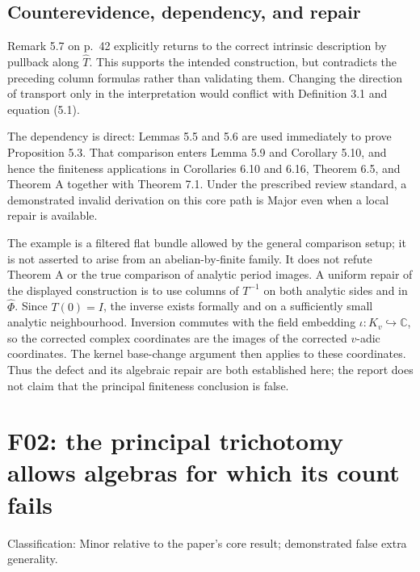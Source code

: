 \documentclass[10pt]{article}
\begin{document}
\subsection*{Counterevidence, dependency, and repair}
Remark 5.7 on p. 42 explicitly returns to the correct intrinsic description by pullback along \(\widehat T\). This supports the intended construction, but contradicts the preceding column formulas rather than validating them. Changing the direction of transport only in the interpretation would conflict with Definition 3.1 and equation (5.1).\par
The dependency is direct: Lemmas 5.5 and 5.6 are used immediately to prove Proposition 5.3. That comparison enters Lemma 5.9 and Corollary 5.10, and hence the finiteness applications in Corollaries 6.10 and 6.16, Theorem 6.5, and Theorem A together with Theorem 7.1. Under the prescribed review standard, a demonstrated invalid derivation on this core path is Major even when a local repair is available.\par
The example is a filtered flat bundle allowed by the general comparison setup; it is not asserted to arise from an abelian-by-finite family. It does not refute Theorem A or the true comparison of analytic period images. A uniform repair of the displayed construction is to use columns of \(T^{-1}\) on both analytic sides and in \(\widehat\Phi\). Since \(T(0)=I\), the inverse exists formally and on a sufficiently small analytic neighbourhood. Inversion commutes with the field embedding \(\iota:K_v\hookrightarrow\mathbb C\), so the corrected complex coordinates are the images of the corrected \(v\)-adic coordinates. The kernel base-change argument then applies to these coordinates. Thus the defect and its algebraic repair are both established here; the report does not claim that the principal finiteness conclusion is false.\par
\section*{F02: the principal trichotomy allows algebras for which its count fails}
Classification: Minor relative to the paper’s core result; demonstrated false extra generality.\par
\end{document}
